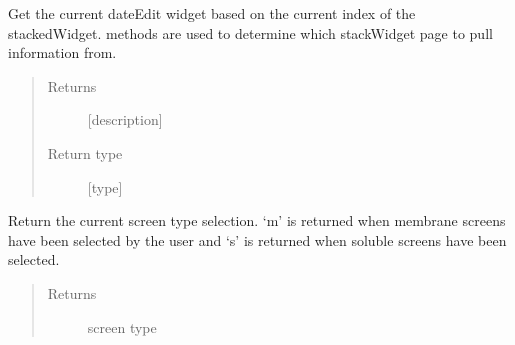 \documentclass[letterpaper,10pt,english]{sphinxmanual}
\begin{document}
\begin{fulllineitems}

\begin{fulllineitems}
\label{\detokenize{polo.windows:polo.windows.run_importer_dialog.RunImporterDialog.current_dateEdit}}
Get the current dateEdit widget based on the current index of
the stackedWidget.  methods are used to determine which
stackWidget page to pull information from.
\begin{quote}\begin{description}
\item[{Returns}] \leavevmode
{[}description{]}

\item[{Return type}] \leavevmode
{[}type{]}

\end{description}\end{quote}

\end{fulllineitems}


\begin{fulllineitems}
\label{\detokenize{polo.windows:polo.windows.run_importer_dialog.RunImporterDialog.current_dir_path_lineEdit}}
\end{fulllineitems}


\begin{fulllineitems}
\label{\detokenize{polo.windows:polo.windows.run_importer_dialog.RunImporterDialog.current_menu_type}}
Return the current screen type selection. ‘m’ is returned when
membrane screens have been selected by the user and ‘s’ is returned
when soluble screens have been selected.
\begin{quote}\begin{description}
\item[{Returns}] \leavevmode
screen type


\end{description}
\end{quote}
\end{fulllineitems}
\end{fulllineitems}
\end{document}
